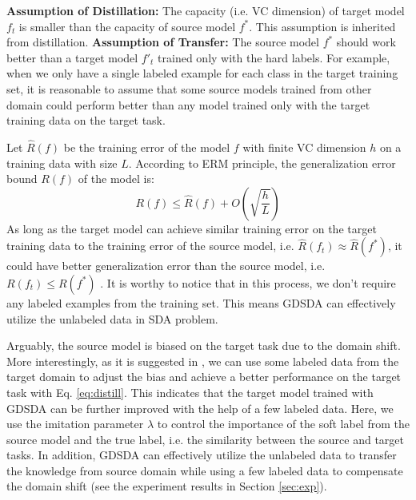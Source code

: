 \textbf{Assumption of Distillation:} The capacity (i.e. VC dimension) of target model $f_t$ is smaller than the capacity of source model $f^*$. This assumption is inherited from distillation.
\textbf{Assumption of Transfer:} The source model $f^*$ should work better than a target model $f'_t$ trained only with the hard labels. For example, when we only have a single labeled example for each class in the target training set, it is reasonable to assume that some source models trained from other domain could perform better than any model trained only with the target training data on the target task.

Let $\hat{R}(f)$ be the training error of the model $f$ with finite VC dimension $h$ on a training data with size $L$. According to ERM principle, the generalization error bound $R(f)$ of the model is:
\begin{equation}
R(f) \leq \hat{R}(f)+O\left(\sqrt{\frac{h}{L}}\right)
\end{equation}
As long as the target model can achieve similar training error on the target training data to the training error of the source model, i.e. $\hat{R}(f_t) \approx \hat{R}(f^*)$, it could have better generalization error than the source model, i.e. $R(f_t)\le R(f^*)$ \cite{hinton2015distilling}. 
It is worthy to notice that in this process, we don't require any labeled examples from the training set. This means GDSDA can effectively utilize the unlabeled data in SDA problem.

Arguably, the source model is biased on the target task due to the domain shift. More interestingly, as it is suggested in \cite{hinton2015distilling}, we can use some labeled data from the target domain to adjust the bias and achieve a better performance on the target task with Eq. \eqref{eq:distill}. This indicates that the target model trained with GDSDA can be further improved with the help of a few labeled data. Here, we use the imitation parameter $\lambda$ to control the importance of the soft label from the source model and the true label, i.e. the similarity between the source and target tasks. In addition, GDSDA can effectively utilize the unlabeled data to transfer the knowledge from source domain while using a few labeled data to compensate the domain shift (see the experiment results in Section \ref{sec:exp}).

